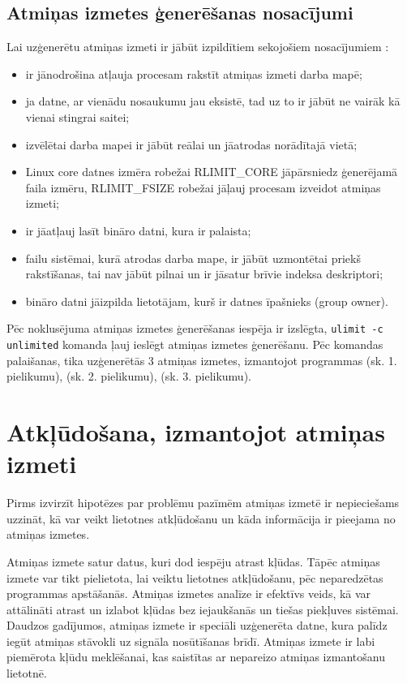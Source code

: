 \subsection{Atmiņas izmetes ģenerēšanas nosacījumi}
Lai  uzģenerētu atmiņas izmeti ir jābūt izpildītiem sekojošiem nosacījumiem \cite {nosacijumi}:
\begin{itemize}
	\item   ir jānodrošina atļauja procesam rakstīt atmiņas izmeti darba mapē;
	\item 	ja datne, ar vienādu nosaukumu jau eksistē, tad uz to ir jābūt ne vairāk kā vienai stingrai saitei;
	\item 	izvēlētai darba mapei ir jābūt reālai un jāatrodas norādītajā vietā;
	\item 	Linux core datnes izmēra robežai {RLIMIT\_CORE} jāpārsniedz ģenerējamā faila izmēru, { RLIMIT\_FSIZE} robežai jāļauj procesam izveidot atmiņas izmeti;
	\item 	ir  jāatļauj lasīt bināro datni, kura ir palaista;
	\item 	failu sistēmai, kurā atrodas darba mape, ir jābūt uzmontētai priekš rakstīšanas, tai nav jābūt pilnai un ir jāsatur brīvie indeksa deskriptori;
	\item 	bināro datni jāizpilda lietotājam, kurš ir datnes īpašnieks (group owner).
\end{itemize} 
 
 Pēc noklusējuma atmiņas izmetes ģenerēšanas iespēja ir izslēgta,  \texttt{ulimit -c unlimited} komanda ļauj ieslēgt atmiņas izmetes ģenerēšanu.
 Pēc komandas palaišanas,  tika uzģenerētās 3 atmiņas izmetes, izmantojot programmas (sk. 1. pielikumu), (sk. 2. pielikumu), (sk. 3. pielikumu).

 


 
 
\section{Atkļūdošana, izmantojot atmiņas izmeti}
Pirms izvirzīt hipotēzes par problēmu pazīmēm atmiņas izmetē ir nepieciešams uzzināt, kā var veikt lietotnes atkļūdošanu un kāda informācija ir pieejama  no atmiņas izmetes.

Atmiņas izmete satur datus, kuri dod iespēju atrast kļūdas. Tāpēc atmiņas izmete var tikt pielietota, lai veiktu lietotnes atkļūdošanu, pēc neparedzētas programmas apstāšanās.
Atmiņas izmetes analīze ir efektīvs veids, kā var attālināti atrast un izlabot kļūdas bez iejaukšanās un tiešas piekļuves sistēmai.
Daudzos gadījumos, atmiņas izmete ir speciāli uzģenerēta datne, kura palīdz iegūt atmiņas stāvokli uz signāla nosūtīšanas brīdī.
Atmiņas izmete ir labi piemērota kļūdu meklēšanai, kas saistītas ar nepareizo atmiņas izmantošanu lietotnē.

